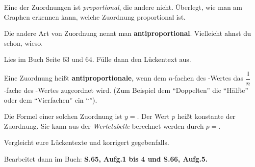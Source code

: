 \documentclass[10pt, a4paper]{scrartcl}
\begin{document}
\begin{aufgabe}[symbol=\symGruppe]
	Eine der Zuordnungen ist \emph{proportional}, die andere nicht. Überlegt, wie man am Graphen erkennen kann, welche Zuordnung proportional ist.
\end{aufgabe}

\begin{aufgabe}[symbol=\symEinzel]
	Die andere Art von Zuordnung nennt man \textbf{antiproportional}. Vielleicht ahnst du schon, wieso.
	
	Lies im Buch Seite 63 und 64. Fülle dann den Lückentext aus. 
	
	\begin{rahmen}
	Eine Zuordnung heißt \textbf{antiproportionale}, wenn dem $n$-fachen des \luecke{.5cm}-Wertes das $\dfrac{1}{n}$-fache des \luecke{.5cm}-Wertes zugeordnet wird. (Zum Beispiel dem \enquote{Doppelten} die \enquote{Hälfte} oder dem \enquote{Vierfachen} ein \enquote{\luecke{2cm}}).
	
	Die Formel einer solchen Zuordnung ist $y=$\luecke{2cm}. Der Wert $p$ heißt \luecke{3cm}konstante der Zuordnung. Sie kann aus der \emph{Wertetabelle} berechnet werden durch $p=$\luecke{2cm}.
	\end{rahmen}
\end{aufgabe}

\begin{aufgabe}[symbol=\symPartner]
	Vergleicht eure Lückentexte und korrigert gegebenfalls.
	
	Bearbeitet dann im Buch: \bfseries S.65, Aufg.1 bis 4 und S.66, Aufg.5.
\end{aufgabe}

\vfill

\begin{center}
\end{center}
\end{document}
